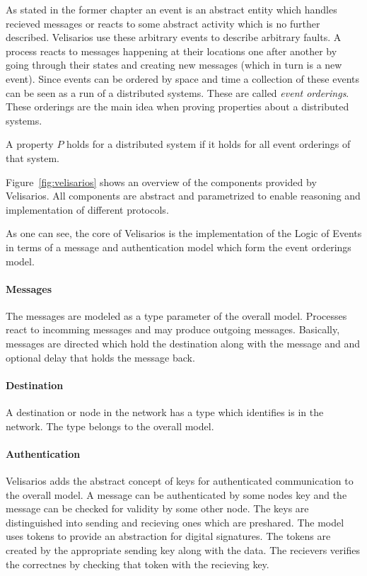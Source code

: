 As stated in the former chapter an event is an abstract entity which handles
recieved messages or reacts to some abstract activity which is no further
described. Velisarios use these arbitrary events to describe arbitrary faults.
A process reacts to messages happening at their locations one after another
by going through their states and creating new messages (which in turn
is a new event). Since events can be ordered by space and time a collection
of these events can be seen as a run of a distributed systems. These are
called \textit{event orderings}. These orderings are the main idea when proving
properties about a distributed systems.~\cite{rahli2018velisarios}

\begin{defi}
  A property $P$ holds for a distributed system if it holds
  for all event orderings of that system.
\end{defi}

Figure~\ref{fig:velisarios} shows an overview of the components provided
by Velisarios. All components are abstract and parametrized to enable
reasoning and implementation of different protocols.~\cite{rahli2018velisarios}

As one can see, the core of Velisarios is the implementation of the Logic of
Events in terms of a message and authentication model which form
the event orderings model.~\cite{rahli2018velisarios}

\paragraph*{Messages}
The messages are modeled as a type parameter  of the overall model.
Processes react to incomming messages and may produce outgoing messages.
Basically, messages are directed which hold the destination along with
the message and and optional delay that holds the message back.~\cite{rahli2018velisarios}

\paragraph*{Destination}
A destination or node in the network has a type  which
identifies is in the network. The type belongs to the overall model.~\cite{rahli2018velisarios}

\paragraph*{Authentication}
Velisarios adds the abstract concept of keys for authenticated communication
to the overall model. A message can be authenticated by some nodes key
and the message can be checked for validity by some other node. The keys
are distinguished into sending and recieving ones which are preshared.
The model uses tokens to provide an abstraction for digital signatures.
The tokens are created by the appropriate sending key along with the data.
The recievers verifies the correctnes by checking that token with the recieving
key.~\cite{rahli2018velisarios}

